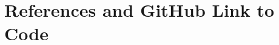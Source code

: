 \documentclass{article}
\begin{document}
\newpage
\section*{References and GitHub Link to Code}
\printbibliography
\end{document}
